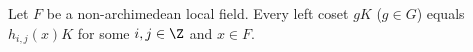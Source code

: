 Let $F$ be a non-archimedean local field. Every left coset $gK$ ($g\in G$) equals $h_{i,j}(x)K$ for some $i,j\in\Z$ and $x\in F$.
